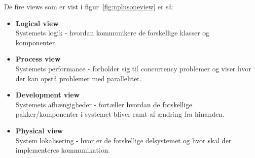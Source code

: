 De fire views som er vist i figur~\ref{fig:nplusoneview} er så:
\begin{itemize}
	\item \textbf{Logical view}\\
	Systemets logik - hvordan kommunikere de forskellige klasser og komponenter.
	\item \textbf{Process view}\\
	Systemets performance - forholder sig til concurrency problemer og viser hvor der kan opstå problemer med parallelitet.
	\item \textbf{Development view}\\
	Systemets afhængigheder - fortæller hvordan de forskellige pakker/komponenter i systemet bliver ramt af ændring fra hinanden.
	\item \textbf{Physical view}\\
	System lokalisering - hvor er de forskellige delsystemet og hvor skal der implementeres kommunikation.
\end{itemize}